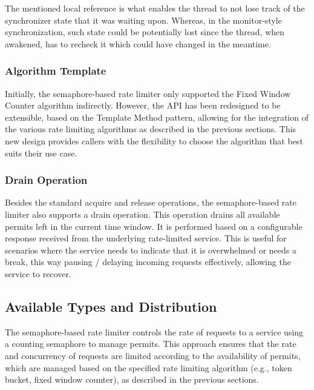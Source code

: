 The mentioned local reference is what
enables the thread to not lose track of the synchronizer state that it was waiting upon.
Whereas, in the monitor-style synchronization, such state could be potentially lost since the thread,
when awakened, has to recheck it which could have changed in the meantime.

\subsubsection{Algorithm Template}\label{subsubsec:rate-limiter-algorithm-template}

Initially, the semaphore-based rate limiter only supported the Fixed Window Counter algorithm indirectly.
However, the API has been redesigned to be extensible, based on the Template Method pattern,
allowing for the integration of the various rate limiting algorithms as described in the previous sections.
This new design provides callers with the flexibility to choose the algorithm that best suits their use case.

\subsubsection{Drain Operation}\label{subsubsec:rate-limiter-drain-operation}

Besides the standard acquire and release operations, the semaphore-based rate limiter also supports a drain operation.
This operation drains all available permits left in the current time window.
It is performed based on a configurable response received from the underlying rate-limited service.
This is useful for scenarios where the service needs to indicate that it is overwhelmed or needs a break,
this way pausing / delaying incoming requests effectively, allowing the service to recover.

\subsection{Available Types and Distribution}\label{subsec:rate-limiter-types-distribution}

The semaphore-based rate limiter controls the rate of requests to a service
using a counting semaphore to manage permits.
This approach ensures that the rate and concurrency of requests are limited according to the availability of permits,
which are managed based on the specified rate limiting algorithm (e.g., token bucket, fixed window counter),
as described in the previous sections.

